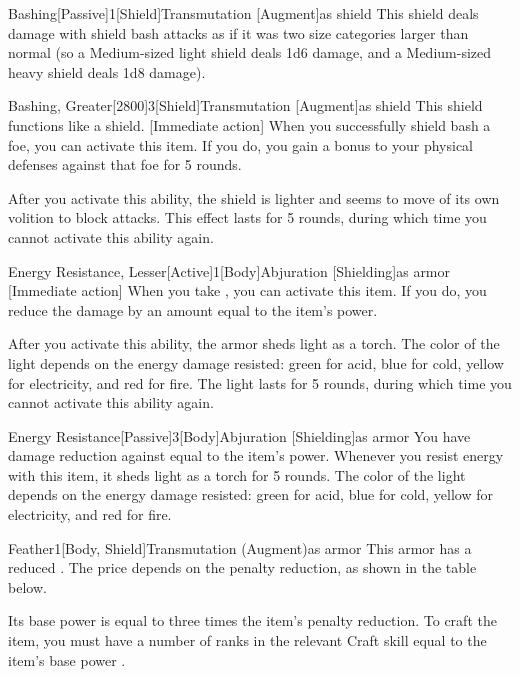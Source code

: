 \begin{magicitemdef}{Bashing}[Passive]{1}[Shield]{Transmutation [Augment]}{as shield}
     This shield deals damage with shield bash attacks as if it was two size categories larger than normal (so a Medium-sized light shield deals 1d6 damage, and a Medium-sized heavy shield deals 1d8 damage).
\end{magicitemdef}

\begin{magicitemdef}{Bashing, Greater}[2800]{3}[Shield]{Transmutation [Augment]}{as shield}
     This shield functions like a  shield.
    [Immediate action] When you successfully shield bash a foe, you can activate this item. If you do, you gain a  bonus to your physical defenses against that foe for 5 rounds.

    After you activate this ability, the shield is lighter and seems to move of its own volition to block attacks.
    This effect lasts for 5 rounds, during which time you cannot activate this ability again.
\end{magicitemdef}

\begin{magicitemdef}{Energy Resistance, Lesser}[Active]{1}[Body]{Abjuration [Shielding]}{as armor}
    [Immediate action] When you take , you can activate this item. If you do, you reduce the damage by an amount equal to the item's power.

    After you activate this ability, the armor sheds light as a torch.
    The color of the light depends on the energy damage resisted: green for acid, blue for cold, yellow for electricity, and red for fire.
    The light lasts for 5 rounds, during which time you cannot activate this ability again.
\end{magicitemdef}

\begin{magicitemdef}{Energy Resistance}[Passive]{3}[Body]{Abjuration [Shielding]}{as armor}
     You have damage reduction against  equal to the item's power.
    Whenever you resist energy with this item, it sheds light as a torch for 5 rounds.
    The color of the light depends on the energy damage resisted: green for acid, blue for cold, yellow for electricity, and red for fire.
\end{magicitemdef}

\begin{magicitemdef}{Feather}{1}[Body, Shield]{Transmutation (Augment)}{as armor}
     This armor has a reduced .
    The price depends on the penalty reduction, as shown in the table below.

    Its base power is equal to three times the item's penalty reduction.
    To craft the item, you must have a number of ranks in the relevant Craft skill equal to the item's base power .
\end{magicitemdef}

